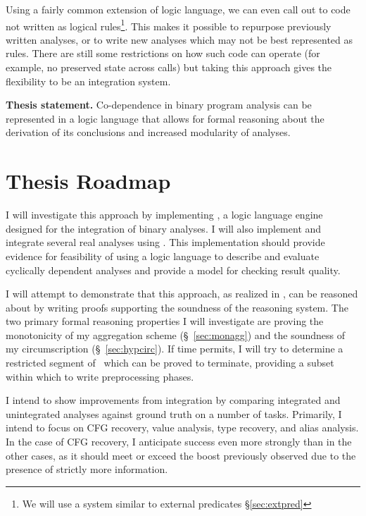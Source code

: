 Using a fairly common extension of logic language, we can even call out to code not written as logical rules\footnote{We will use a system similar to external predicates \S\ref{sec:extpred}}.
This makes it possible to repurpose previously written analyses, or to write new analyses which may not be best represented as rules.
There are still some restrictions on how such code can operate (for example, no preserved state across calls) but taking this approach gives the flexibility to be an integration system.

\begin{inset}
{\bf Thesis statement.}
Co-dependence in binary program analysis can be represented in a logic language that allows for formal reasoning about the derivation of its conclusions and increased modularity of analyses.
\end{inset}
\section{Thesis Roadmap}
I will investigate this approach by implementing \sysname, a logic language engine designed for the integration of binary analyses.
I will also implement and integrate several real analyses using \sysname.
This implementation should provide evidence for feasibility of using a logic language to describe and evaluate cyclically dependent analyses and provide a model for checking result quality.

I will attempt to demonstrate that this approach, as realized in \sysname, can be reasoned about by writing proofs supporting the soundness of the reasoning system.
The two primary formal reasoning properties I will investigate are proving the monotonicity of my aggregation scheme (\S~\ref{sec:monagg}) and the soundness of my circumscription (\S~\ref{sec:hypcirc}).
If time permits, I will try to determine a restricted segment of \sysname\ which can be proved to terminate, providing a subset within which to write preprocessing phases.

I intend to show improvements from integration by comparing integrated and unintegrated analyses against ground truth on a number of tasks.
Primarily, I intend to focus on CFG recovery, value analysis, type recovery, and alias analysis.
In the case of CFG recovery, I anticipate success even more strongly than in the other cases, as it should meet or exceed the boost previously observed\cite{jakstab} due to the presence of strictly more information.

